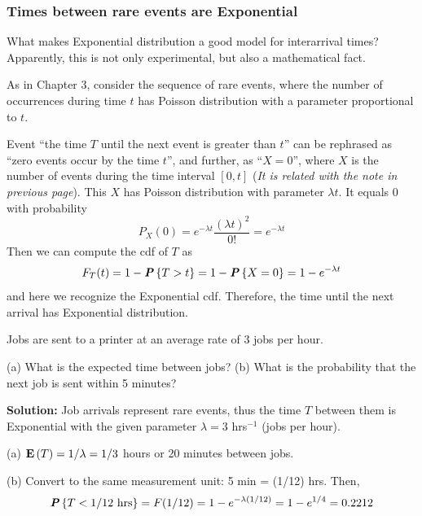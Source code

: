 \subsubsection{Times between rare events are Exponential}

What makes Exponential distribution a good model for interarrival times? Apparently, this is not only experimental, but also a mathematical fact.

As in Chapter 3, consider the sequence of rare events, where the number of occurrences during time $t$ has Poisson distribution with a parameter proportional to $t$. 

Event ``the time $T$ until the next event is greater than $t$'' can be rephrased as ``zero events occur by the time $t$'', and further, as ``$X = 0$'', where $X$ is the number of events during the time interval $\left[ 0, t \right]$ (\textit{It is related with the note in previous page}). This $X$ has Poisson distribution with parameter $\lambda t$. It equals 0 with probability
\begin{equation*}
    P_X(0) = e^{-\lambda t} \frac{(\lambda t)^2}{0!} = e^{-\lambda t}
\end{equation*}
Then we can compute the cdf of $T$ as
\begin{equation}
    F_T(t) = 1 - \textbf{\textit{P}}\left\{T > t\right\} = 1 - \textbf{\textit{P}}\left\{X = 0\right\} = 1 - e^{-\lambda t}
\end{equation}
and here we recognize the Exponential cdf. Therefore, the time until the next arrival has Exponential distribution.

\begin{example}{}
Jobs are sent to a printer at an average rate of 3 jobs per hour.

(a) What is the expected time between jobs?
(b) What is the probability that the next job is sent within 5 minutes?

\textbf{Solution:}
Job arrivals represent rare events, thus the time $T$ between them is Exponential with the given parameter $\lambda = 3$ hrs$^{-1}$ (jobs per hour).

(a) $\mathbf{E}\left(T\right) = 1/\lambda = 1/3$ hours or 20 minutes between jobs.

(b) Convert to the same measurement unit: 5 min = (1/12) hrs. Then,
\begin{equation*}
    \textbf{\textit{P}}\left\{T < 1/12 \textnormal{ hrs}\right\} = F(1/12) = 1 - e^{-\lambda (1/12)} = 1 - e^{1/4} = 0.2212
\end{equation*}
\end{example}

